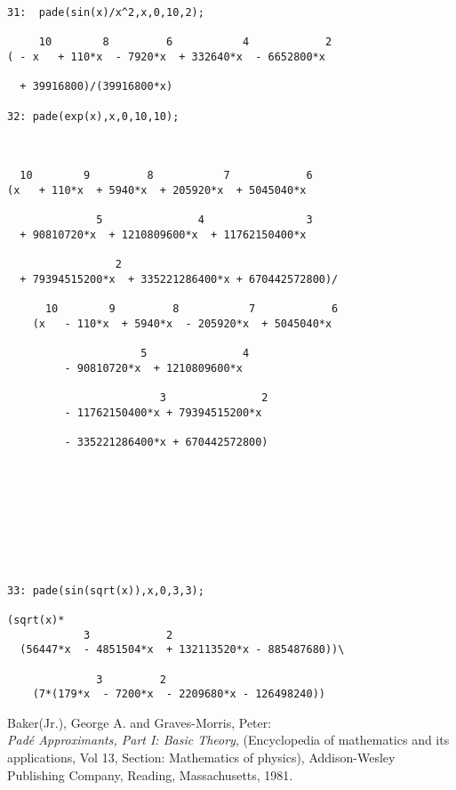 \begin{verbatim}
31:  pade(sin(x)/x^2,x,0,10,2);

     10        8         6           4            2
( - x   + 110*x  - 7920*x  + 332640*x  - 6652800*x

  + 39916800)/(39916800*x)

32: pade(exp(x),x,0,10,10); 



  10        9         8           7            6
(x   + 110*x  + 5940*x  + 205920*x  + 5045040*x

              5               4                3
  + 90810720*x  + 1210809600*x  + 11762150400*x

                 2
  + 79394515200*x  + 335221286400*x + 670442572800)/

      10        9         8           7            6
    (x   - 110*x  + 5940*x  - 205920*x  + 5045040*x

                     5               4
         - 90810720*x  + 1210809600*x 

                        3               2
         - 11762150400*x + 79394515200*x  

         - 335221286400*x + 670442572800)









33: pade(sin(sqrt(x)),x,0,3,3);
        
(sqrt(x)*
            3            2
  (56447*x  - 4851504*x  + 132113520*x - 885487680))\

              3         2
    (7*(179*x  - 7200*x  - 2209680*x - 126498240))
\end{verbatim}


\begin{thebibliography}{9}
 Baker(Jr.), George A. and Graves-Morris, Peter:\\
{\it Pad\'{e} Approximants, Part I: Basic Theory},
(Encyclopedia of mathematics and its applications, Vol 13,
Section: Mathematics of physics),
Addison-Wesley Publishing Company, Reading, Massachusetts, 1981.
\end{thebibliography}


